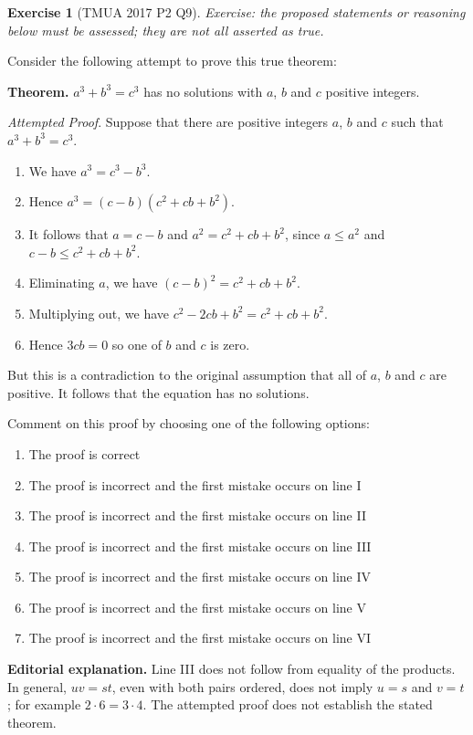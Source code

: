 \documentclass[11pt]{article}
\theoremstyle{definition}
\newtheorem{example}[theorem]{Exercise}
\theoremstyle{remark}
\newcommand{\pqty}[1]{\left(#1\right)}
\begin{document}
\begin{example}[TMUA 2017 P2 Q9]\label{tmua-6-unit-027}
\textit{Exercise: the proposed statements or reasoning below must be assessed; they are not all asserted as true.}\par

    Consider the following attempt to prove this true theorem:

    \textbf{Theorem.} \(a^3 + b^3 = c^3\) has no solutions with \(a\), \(b\) and \(c\) positive integers.

    \textit{Attempted Proof}. Suppose that there are positive integers \(a\), \(b\) and \(c\) such that \(a^3 + b^3 = c^3\).

    \begin{enumerate}[label=\Roman*.]
        \item We have \(a^3 = c^3 - b^3\).
        \item Hence \(a^3 = \pqty{c - b}\pqty{c^2 + cb + b^2}\).
        \item It follows that \(a = c - b\) and \(a^2 = c^2 + cb + b^2\), since \(a \leq a^2\) and \(c - b \leq c^2 + cb + b^2\).
        \item Eliminating \(a\), we have \(\pqty{c - b}^2 = c^2 + cb + b^2\).
        \item Multiplying out, we have \(c^2 - 2cb + b^2 = c^2 + cb + b^2\).
        \item Hence \(3cb = 0\) so one of \(b\) and \(c\) is zero.
    \end{enumerate}

    But this is a contradiction to the original assumption that all of \(a\), \(b\) and \(c\) are positive. It follows that the equation has no solutions.

    Comment on this proof by choosing one of the following options:
        
\begin{enumerate}[label=\Alph*.]
    \item The proof is correct
    \item The proof is incorrect and the first mistake occurs on line I
    \item The proof is incorrect and the first mistake occurs on line II
    \item The proof is incorrect and the first mistake occurs on line III
    \item The proof is incorrect and the first mistake occurs on line IV
    \item The proof is incorrect and the first mistake occurs on line V
    \item The proof is incorrect and the first mistake occurs on line VI
\end{enumerate}

\textbf{Editorial explanation.} Line III does not follow from equality of the products. In general, \(u v=s t\), even with both pairs ordered, does not imply \(u=s\) and \(v=t\); for example \(2\cdot6=3\cdot4\). The attempted proof does not establish the stated theorem.
\end{example}
\end{document}

